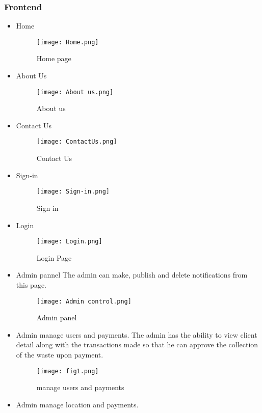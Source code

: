 \documentclass{article}
\begin{document}
\subsubsection{\\Frontend}
\begin{itemize}
\item Home
\begin{figure}[h]
\texttt{[image: Home.png]}
\caption{Home page}
\end{figure}
\newpage
\item About Us
\begin{figure}[h]
\texttt{[image: About us.png]}
\caption{About us}
\end{figure}
\item Contact Us
\begin{figure}[h]
\texttt{[image: ContactUs.png]}
\caption{Contact Us}
\end{figure}
\newline
\newpage
\item Sign-in
\begin{figure}[h]
\texttt{[image: Sign-in.png]}
\caption{Sign in}
\end{figure}
\newline
\item Login
\begin{figure}[h]
\texttt{[image: Login.png]}
\caption{Login Page}
\end{figure}
\newline
\newpage
\item Admin pannel
\newline
The admin can make, publish and delete notifications from this page.
\begin{figure}[h]
\texttt{[image: Admin control.png]}
\caption{Admin panel}
\end{figure}
\newline
\newpage
\item Admin manage users and payments.
\newline
The admin has the ability to view client detail along with the transactions made so that he can approve the collection of the waste upon payment.
\begin{figure}[h]
\texttt{[image: fig1.png]}
\caption{manage users and payments}
\end{figure}
\newline
\item Admin manage location and payments.

\end{itemize}
\end{document}
